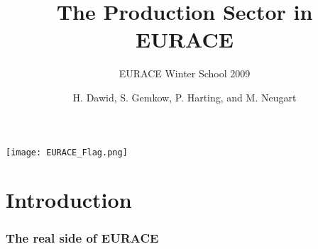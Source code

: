 \documentclass{beamer}
\title{The Production Sector in EURACE}
\subtitle{EURACE Winter School 2009}
\author{H. Dawid, S. Gemkow, P.
Harting, and M. Neugart}
\begin{document}
\begin{frame}{}
\centering
\texttt{[image: EURACE\_Flag.png]}
\titlepage
\end{frame}

\section[Overview]{}
\frame{\tableofcontents}

\section{Introduction}





\frame
{
  \frametitle{The real side of EURACE} 


		
		
		
		
	
	 







}
\end{document}
